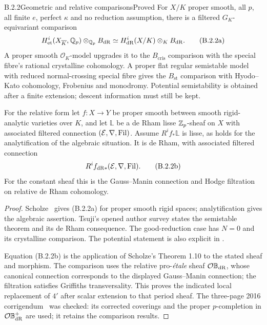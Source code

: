 \begin{result}{B.2.2}{Geometric and relative comparisons}{Proved}
For $X/K$ proper smooth, all $p$, all finite $e$, perfect
$\kappa$ and no reduction assumption, there is a filtered
$G_K$-equivariant comparison
\[
 H^i_{\mathrm{et}}(X_{\overline K},\mathbb Q_p)\otimes_{\mathbb Q_p}B_{\mathrm{dR}}
  \simeq H^i_{\mathrm{dR}}(X/K)\otimes_KB_{\mathrm{dR}}.
 \tag{B.2.2a}
\]
A proper smooth $\mathcal O_K$-model upgrades it to the
$B_{\mathrm{cris}}$ comparison with the special fibre's rational
crystalline cohomology. A proper flat regular semistable model
with reduced normal-crossing special fibre gives the
$B_{\mathrm{st}}$ comparison with Hyodo--Kato cohomology,
Frobenius and monodromy. Potential semistability is obtained
after a finite extension; descent information must still be kept.

For the relative form let $f:X\to Y$ be proper smooth between
smooth rigid-analytic varieties over $K$, and let $\mathbb L$ be
a de Rham lisse $\mathbb Z_p$-sheaf on $X$ with associated filtered
connection $(\mathcal E,\nabla,\mathrm{Fil})$. Assume
$R^if_*\mathbb L$ is lisse, as holds for the analytification of
the algebraic situation. It is de Rham, with associated filtered
connection
\[
                         R^if_{\mathrm{dR}*}(\mathcal E,\nabla,\mathrm{Fil}).
 \tag{B.2.2b}
\]
For the constant sheaf this is the Gauss--Manin connection and
Hodge filtration on relative de Rham cohomology.
\end{result}
\begin{proof}
Scholze~\cite[Theorem 1.6 and Corollary 1.8]{Scholze2013}
gives (B.2.2a) for proper smooth rigid spaces; analytification
gives the algebraic assertion. Tsuji's opened author survey
\cite[Theorem 1.1 and Appendix Theorem A1]{Tsuji2002Survey}
states the semistable theorem and its de Rham consequence.
The good-reduction case has $N=0$ and its crystalline comparison.
The potential statement is also explicit in
\cite[Theorem 2.2.1 and Corollary 2.2.3]{Tsuji1998ICM}.

Equation (B.2.2b) is the application of Scholze's Theorem 1.10
to the stated sheaf and morphism. The comparison uses the
relative pro-\emph{\'etale} sheaf $\mathcal O\mathbb B_{\mathrm{dR}}$,
whose canonical connection corresponds to the displayed
Gauss--Manin connection; the filtration satisfies Griffiths
transversality. This proves the indicated local replacement
of $4'$ after scalar extension to that period sheaf.
The three-page 2016 corrigendum~\cite{Scholze2016Corrigendum}
was checked: its corrected coverings and the proper
$p$-completion in $\mathcal O\mathbb B_{\mathrm{dR}}^+$ are used;
it retains the comparison results.
\end{proof}

